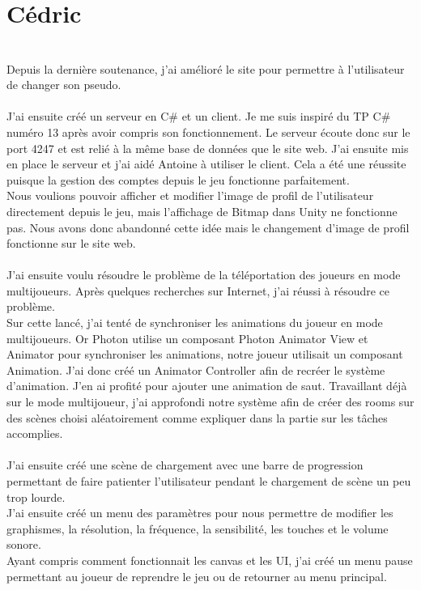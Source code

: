 \documentclass[titlepage, 13px, a4paper]{report}
\begin{document}
\newpage



\section{Cédric}
\paragraph{} \hspace{0pt} \\
Depuis la dernière soutenance, j'ai amélioré le site pour permettre à l’utilisateur de changer son pseudo. \\ \\

J’ai ensuite créé un serveur en C\# et un client. Je me suis inspiré du TP C\# numéro 13 après avoir compris son fonctionnement. Le serveur écoute donc sur le port 4247 et est relié à la même base de données que le site web. J’ai ensuite mis en place le serveur et j’ai aidé Antoine à utiliser le client.
Cela a été une réussite puisque la gestion des comptes depuis le jeu fonctionne parfaitement. \\
Nous voulions pouvoir afficher et modifier l’image de profil de l’utilisateur directement depuis le jeu, 
mais l’affichage de Bitmap dans Unity ne fonctionne pas. Nous avons donc abandonné cette idée mais le 
changement d’image de profil fonctionne sur le site web. \\ \\


J’ai ensuite voulu résoudre le problème de la téléportation des joueurs en mode multijoueurs. 
Après quelques recherches sur Internet, j’ai réussi à résoudre ce problème. \\
Sur cette lancé, j’ai tenté de synchroniser les animations du joueur en mode multijoueurs. 
Or Photon utilise un composant Photon Animator View et Animator pour synchroniser les animations, notre joueur utilisait un composant Animation. J’ai donc créé un Animator Controller afin de recréer le système d’animation. J’en ai profité pour ajouter une animation de saut.
Travaillant déjà sur le mode multijoueur, j’ai approfondi notre système afin de créer 
des rooms sur des scènes choisi aléatoirement comme expliquer dans la partie sur les tâches accomplies. \\ \\


J’ai ensuite créé une scène de chargement avec une barre de progression permettant de faire patienter 
l’utilisateur pendant le chargement de scène un peu trop lourde. \\
J’ai ensuite créé un menu des paramètres pour nous permettre de modifier les graphismes, la résolution, 
la fréquence, la sensibilité, les touches et le volume sonore. \\
Ayant compris comment fonctionnait les canvas et les UI, j’ai créé un menu pause permettant au joueur 
de reprendre le jeu ou de retourner au menu principal. \\ \\
\end{document}
